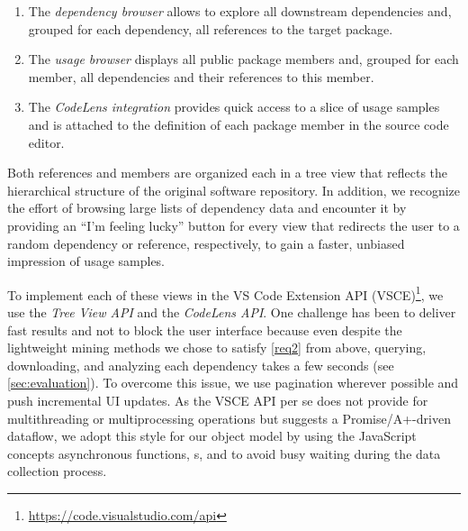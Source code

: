 \documentclass[a4paper,twoside]{article}
\begin{document}
\begin{enumerate}[label=(\roman*)]
	\item The \emph{dependency browser} allows to explore all downstream dependencies and, grouped for each dependency, all references to the target package.
	\item The \emph{usage browser} displays all public package members and, grouped for each member, all dependencies and their references to this member.
	\item The \emph{CodeLens integration} provides quick access to a slice of usage samples and is attached to the definition of each package member in the source code editor.
\end{enumerate}


Both references and members are organized each in a tree view that reflects the hierarchical structure of the original software repository.
In addition, we recognize the effort of browsing large lists of dependency data and encounter it by providing an \enquote{I'm feeling lucky} button for every view that redirects the user to a random dependency or reference, respectively, to gain a faster, unbiased impression of usage samples.

To implement each of these views in the VS Code Extension API (VSCE)\footnote{\url{https://code.visualstudio.com/api}}, we use the \emph{Tree View API} and the \emph{CodeLens API}.
One challenge has been to deliver fast results and not to block the user interface because even despite the lightweight mining methods we chose to satisfy \cref{req2} from above, querying, downloading, and analyzing each dependency takes a few seconds (see \cref{sec:evaluation}).
To overcome this issue, we use pagination wherever possible and push incremental UI updates. %
As the VSCE API per se does not provide for multithreading or multiprocessing operations but suggests a Promise/A+-driven dataflow, we adopt this style for our object model by using the JavaScript concepts asynchronous functions, s, and  to avoid busy waiting during the data collection process.
\end{document}
